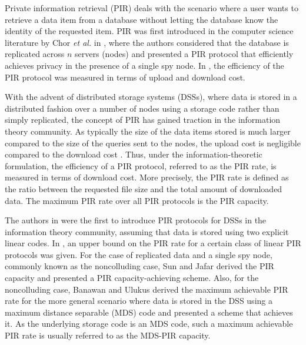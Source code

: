 \documentclass[twocolumn,conference]{IEEEtran}
\begin{document}
Private information retrieval (PIR) deals with the scenario where a user wants to retrieve a data item from a database without letting the database know the identity of the requested item. PIR was first introduced in the computer science literature by Chor \emph{et al.} in \cite{cho95}, where the authors considered that the database is replicated across $n$ servers (nodes) and presented a PIR protocol 
that efficiently achieves privacy in the presence of a single spy node. In \cite{cho95}, the efficiency of the PIR protocol was measured in terms of upload and download cost. 

With the advent of distributed storage systems (DSSs), where data is stored in a distributed fashion over a number of nodes using a storage code rather than simply replicated, the concept of PIR has gained traction in the information theory community. As typically the size of the data items stored is much larger compared to the size of the queries sent to the nodes, the upload cost is negligible compared to the download cost \cite{cha15}. Thus, under the information-theoretic formulation, the efficiency of a PIR protocol, referred to as the PIR rate, is measured in terms of download cost. More precisely, the PIR rate is defined as the ratio between the requested file size and the total amount of downloaded data. The maximum PIR rate over all PIR protocols is the PIR capacity.


The authors in \cite{sha14} were the first to introduce PIR protocols for DSSs in the information theory community, assuming that data is stored using two explicit linear codes. In \cite{cha15}, an upper bound on the PIR rate for a certain class of linear PIR protocols was given. 
For the case of replicated data and a single spy node, commonly known as the noncolluding case, Sun and Jafar \cite{SunJafar17_1} derived the PIR capacity and  presented a PIR capacity-achieving scheme. Also, for the noncolluding case, Banawan and Ulukus \cite{BanawanUlukus18_1} derived the maximum achievable PIR rate for the more general scenario where data is stored in the DSS using a maximum distance separable (MDS) code and presented a scheme that achieves it. As the underlying storage code is an MDS code, such a maximum achievable PIR rate is usually referred to as the MDS-PIR capacity.
\end{document}
